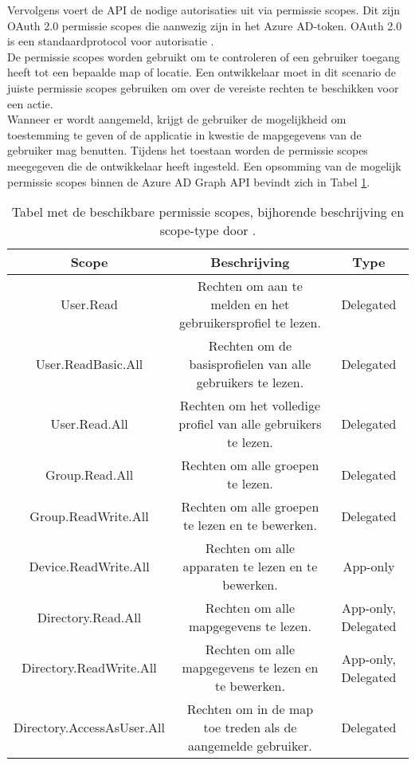 Vervolgens voert de \ac{API} de nodige autorisaties uit via permissie scopes. Dit zijn OAuth 2.0 permissie scopes die aanwezig zijn in het Azure \Ac{AD}-token. OAuth 2.0 is een standaardprotocol voor autorisatie \autocite{OAuth}. \\

De permissie scopes worden gebruikt om te controleren of een gebruiker toegang heeft tot een bepaalde map of locatie. Een ontwikkelaar moet in dit scenario de juiste permissie scopes gebruiken om over de vereiste rechten te beschikken voor een actie. \\

Wanneer er wordt aangemeld, krijgt de gebruiker de mogelijkheid om toestemming te geven of de applicatie in kwestie de mapgegevens van de gebruiker mag benutten. Tijdens het toestaan worden de permissie scopes meegegeven die de ontwikkelaar heeft ingesteld. Een opsomming van de mogelijk permissie scopes binnen de Azure \ac{AD} Graph \ac{API} bevindt zich in Tabel \ref{psaad}. 

\begin{table}[ht]
    \centering
    \begin{adjustbox}{width=1\textwidth}
    \begin{tabular}{ |c|c|c| }
        \hline
        \textbf{Scope} & \textbf{Beschrijving} & \textbf{Type} \\
        \hline
        User.Read & Rechten om aan te melden en het gebruikersprofiel te lezen. & Delegated \\
        User.ReadBasic.All & Rechten om de basisprofielen van alle gebruikers te lezen. & Delegated \\
        User.Read.All & Rechten om het volledige profiel van alle gebruikers te lezen. & Delegated \\
        Group.Read.All & Rechten om alle groepen te lezen. & Delegated \\
        Group.ReadWrite.All & Rechten om alle groepen te lezen en te bewerken. & Delegated \\
        Device.ReadWrite.All & Rechten om alle apparaten te lezen en te bewerken. & App-only \\
        Directory.Read.All & Rechten om alle mapgegevens te lezen. & App-only, Delegated \\
        Directory.ReadWrite.All & Rechten om alle mapgegevens te lezen en te bewerken. & App-only, Delegated \\
        Directory.AccessAsUser.All & Rechten om in de map toe treden als de aangemelde gebruiker. & Delegated \\
        \hline
    \end{tabular}
    \end{adjustbox}
    \caption[Tabel Azure \ac{AD} Graph Permission scopes]{Tabel met de beschikbare permissie scopes, bijhorende beschrijving en scope-type door \textcite{Microsoft2016a}.}
    \label{psaad}
\end{table}

